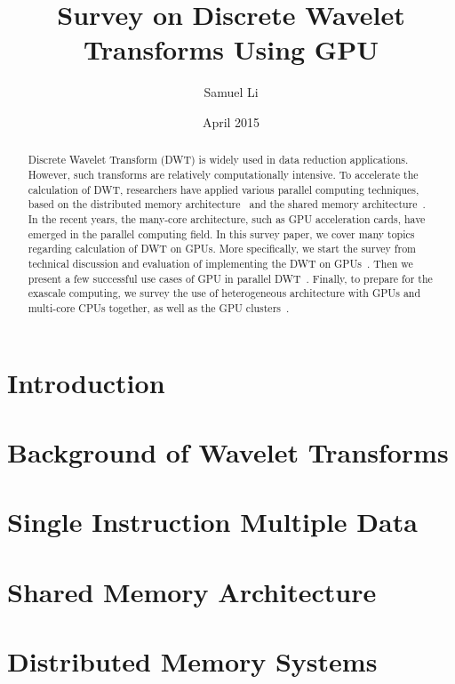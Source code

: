 \documentclass{article}
\title{Survey on Discrete Wavelet Transforms Using GPU}
\author{Samuel Li}
\date{April 2015}
\begin{document}
\onehalfspacing

\maketitle

\begin{abstract}
Discrete Wavelet Transform (DWT) is widely used in data reduction applications.
%
However, such transforms are relatively computationally intensive.
%
To accelerate the calculation of DWT, researchers have applied various parallel
computing techniques, based on the distributed memory architecture~\cite{
chadha2002scalable, nielsen1997scalable}
and the shared memory architecture~\cite{
kutil1999hardware,lucka2000parallel}.
%
In the recent years, the many-core architecture, such as GPU acceleration 
cards, have emerged in the parallel computing field.
%
In this survey paper, we cover many topics regarding calculation of DWT on GPUs.
%
More specifically, we start the survey from technical discussion and evaluation
of implementing the DWT on GPUs~\cite{tenllado2008parallel, van2011accelerating,
garcia2005gpu}.
%
Then we present a few successful use cases of GPU in parallel DWT~\cite{
strengert2004hierarchical, strengert2006pyramid, wong2007discrete,
treib2012turbulence}.
%
Finally, to prepare for the exascale computing, we survey the use of 
heterogeneous architecture with GPUs and multi-core CPUs together,
as well as the GPU clusters~\cite{franco2009parallel, franco2010parallel,
strengert2005large, franco20122d, rossinelli2011multicore}.
%
\end{abstract}

\section{Introduction}

\section{Background of Wavelet Transforms}

\label{sec:bg}

\section{Single Instruction Multiple Data}

\label{sec:simd}

\section{Shared Memory Architecture}

\label{sec:sma}

\section{Distributed Memory Systems}

\label{sec:dma}

 
%

\end{document}
